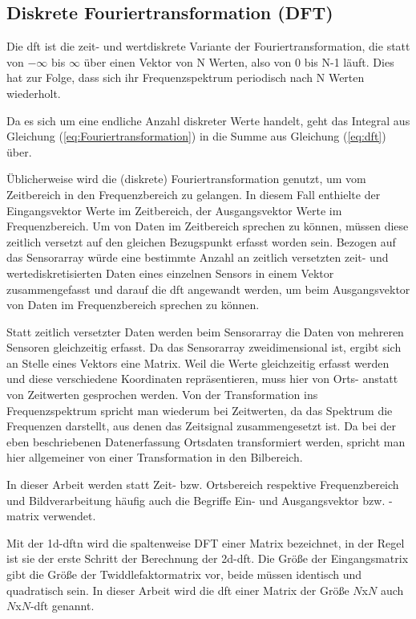 \subsection{Diskrete Fouriertransformation (DFT)}\label{sec:dft}

Die \gls{dft} ist die zeit- und wertdiskrete Variante der Fouriertransformation, die statt von $-\infty$ bis $\infty$ über einen Vektor von N Werten, also von 0 bis N-1 läuft. 
Dies hat zur Folge, dass sich ihr Frequenzspektrum periodisch nach N Werten wiederholt.

Da es sich um eine endliche Anzahl diskreter Werte handelt, geht das Integral aus Gleichung (\ref{eq:Fouriertransformation}) in die Summe aus Gleichung (\ref{eq:dft}) über. 


Üblicherweise wird die (diskrete) Fouriertransformation genutzt, um vom Zeitbereich in den Frequenzbereich zu gelangen. In diesem Fall enthielte der Eingangsvektor 
Werte im Zeitbereich, der Ausgangsvektor Werte im Frequenzbereich.
Um von Daten im Zeitbereich sprechen zu können, müssen diese zeitlich versetzt auf den gleichen Bezugspunkt erfasst worden sein. 
Bezogen auf das Sensorarray würde eine bestimmte Anzahl an zeitlich versetzten zeit- und wertediskretisierten Daten eines einzelnen Sensors in einem Vektor zusammengefasst 
und darauf die \gls{dft} angewandt werden, um beim Ausgangsvektor von Daten im Frequenzbereich sprechen zu können.

Statt zeitlich versetzter Daten werden beim Sensorarray die Daten von mehreren Sensoren gleichzeitig erfasst. Da das Sensorarray zweidimensional ist, ergibt
sich an Stelle eines Vektors eine Matrix. Weil die Werte gleichzeitig erfasst werden und diese verschiedene Koordinaten repräsentieren, muss hier von Orts- anstatt von
Zeitwerten gesprochen werden. Von der Transformation ins Frequenzspektrum spricht man wiederum bei Zeitwerten, da das Spektrum die Frequenzen darstellt, aus denen das Zeitsignal 
zusammengesetzt ist. Da bei der eben beschriebenen Datenerfassung Ortsdaten transformiert werden, spricht man hier allgemeiner von einer Transformation in den Bilbereich. 

In dieser Arbeit werden statt Zeit- bzw. Ortsbereich respektive Frequenzbereich und Bildverarbeitung häufig auch die Begriffe Ein- und Ausgangsvektor bzw. -matrix verwendet.

Mit der \gls{1d-dftn} wird die spaltenweise DFT einer Matrix bezeichnet, in der Regel ist sie der erste Schritt der Berechnung der \gls{2d-dft}. 
Die Größe der Eingangsmatrix gibt die Größe der Twiddlefaktormatrix vor, beide müssen identisch und
quadratisch sein. In dieser Arbeit wird die \gls{dft} einer Matrix der Größe $N$x$N$ auch $N$x$N$-\gls{dft} genannt.


